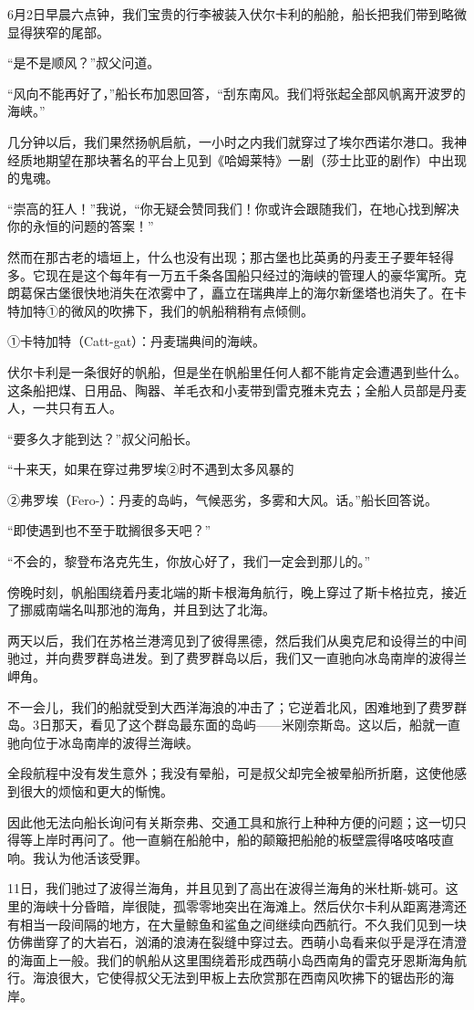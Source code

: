 \documentclass[10pt]{book}
\begin{document}
6月2日早晨六点钟，我们宝贵的行李被装入伏尔卡利的船舱，船长把我们带到略微显得狭窄的尾部。

“是不是顺风？”叔父问道。

“风向不能再好了，”船长布加恩回答，“刮东南风。我们将张起全部风帆离开波罗的海峡。”

几分钟以后，我们果然扬帆启航，一小时之内我们就穿过了埃尔西诺尔港口。我神经质地期望在那块著名的平台上见到《哈姆莱特》一剧（莎士比亚的剧作）中出现的鬼魂。

“崇高的狂人！”我说，“你无疑会赞同我们！你或许会跟随我们，在地心找到解决你的永恒的问题的答案！”

然而在那古老的墙垣上，什么也没有出现；那古堡也比英勇的丹麦王子要年轻得多。它现在是这个每年有一万五千条各国船只经过的海峡的管理人的豪华寓所。克朗葛保古堡很快地消失在浓雾中了，矗立在瑞典岸上的海尔新堡塔也消失了。在卡特加特①的微风的吹拂下，我们的帆船稍稍有点倾侧。

①卡特加特（Catt-gat）：丹麦瑞典间的海峡。

伏尔卡利是一条很好的帆船，但是坐在帆船里任何人都不能肯定会遭遇到些什么。这条船把煤、日用品、陶器、羊毛衣和小麦带到雷克雅未克去；全船人员部是丹麦人，一共只有五人。

“要多久才能到达？”叔父问船长。

“十来天，如果在穿过弗罗埃②时不遇到太多风暴的

②弗罗埃（Fero-）：丹麦的岛屿，气候恶劣，多雾和大风。话。”船长回答说。

“即使遇到也不至于耽搁很多天吧？”

“不会的，黎登布洛克先生，你放心好了，我们一定会到那儿的。”

傍晚时刻，帆船围绕着丹麦北端的斯卡根海角航行，晚上穿过了斯卡格拉克，接近了挪威南端名叫那池的海角，并且到达了北海。

两天以后，我们在苏格兰港湾见到了彼得黑德，然后我们从奥克尼和设得兰的中间驰过，并向费罗群岛进发。到了费罗群岛以后，我们又一直驰向冰岛南岸的波得兰岬角。

不一会儿，我们的船就受到大西洋海浪的冲击了；它逆着北风，困难地到了费罗群岛。3日那天，看见了这个群岛最东面的岛屿——米刚奈斯岛。这以后，船就一直驰向位于冰岛南岸的波得兰海峡。

全段航程中没有发生意外；我没有晕船，可是叔父却完全被晕船所折磨，这使他感到很大的烦恼和更大的惭愧。

因此他无法向船长询问有关斯奈弗、交通工具和旅行上种种方便的问题；这一切只得等上岸时再问了。他一直躺在船舱中，船的颠簸把船舱的板壁震得咯吱咯吱直响。我认为他活该受罪。

11日，我们驰过了波得兰海角，并且见到了高出在波得兰海角的米杜斯-姚可。这里的海峡十分昏暗，岸很陡，孤零零地突出在海滩上。然后伏尔卡利从距离港湾还有相当一段间隔的地方，在大量鲸鱼和鲨鱼之间继续向西航行。不久我们见到一块仿佛凿穿了的大岩石，汹涌的浪涛在裂缝中穿过去。西萌小岛看来似乎是浮在清澄的海面上一般。我们的帆船从这里围绕着形成西萌小岛西南角的雷克牙恩斯海角航行。海浪很大，它使得叔父无法到甲板上去欣赏那在西南风吹拂下的锯齿形的海岸。
\end{document}
